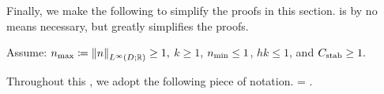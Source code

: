 Finally, we make the following  to simplify the proofs in this section.  is by no means necessary, but greatly simplifies the proofs.

\label{ass:convenient}
Assume: $\nmax \de \NLiDRR{n} \geq 1,$ $k \geq 1$, $n_{\min} \leq 1$, $hk \leq 1$, and $C_{\mathrm{stab}} \geq 1.$
\eas

Throughout this , we adopt the following piece of notation.
\beqs
\nvar = \frac{\nmax}{\nmin}.
\eeqs

